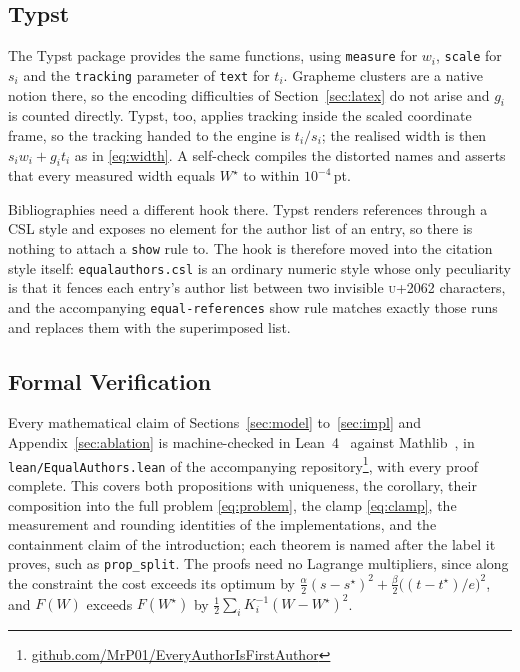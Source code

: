 \documentclass[10pt,twocolumn]{article}
\newcommand{\code}{\lstinline}
\newcommand{\repolink}{\href{https://github.com/MrP01/EveryAuthorIsFirstAuthor}{github.com/MrP01/EveryAuthorIsFirstAuthor}}
\theoremstyle{plain}
\theoremstyle{definition}
\begin{document}
  \subsection{Typst}
  The Typst package provides the same functions, using \code|measure| for $w_i$, \code|scale| for $s_i$ and the \code|tracking| parameter of \code|text| for $t_i$.
  Grapheme clusters are a native notion there, so the encoding difficulties of Section~\ref{sec:latex} do not arise and $g_i$ is counted directly.
  Typst, too, applies tracking inside the scaled coordinate frame, so the tracking handed to the engine is $t_i / s_i$; the realised width is then $s_i w_i + g_i t_i$ as in \eqref{eq:width}.
  A self-check compiles the distorted names and asserts that every measured width equals $W^\star$ to within $10^{-4}$\,pt.

  Bibliographies need a different hook there.
  Typst renders references through a CSL style and exposes no element for the author list of an entry, so there is nothing to attach a \code|show| rule to.
  The hook is therefore moved into the citation style itself: \code|equalauthors.csl| is an ordinary numeric style whose only peculiarity is that it fences each entry's author list between two invisible \textsc{u+2062} characters, and the accompanying \code|equal-references| show rule matches exactly those runs and replaces them with the superimposed list.

  \subsection{Formal Verification}
  \label{sec:lean}
  Every mathematical claim of Sections~\ref{sec:model} to~\ref{sec:impl} and Appendix~\ref{sec:ablation} is machine-checked in Lean~4~\cite{demoura2021lean4} against Mathlib~\cite{mathlib2020}, in \code|lean/EqualAuthors.lean| of the accompanying repository\footnote{\repolink}, with every proof complete.
  This covers both propositions with uniqueness, the corollary, their composition into the full problem \eqref{eq:problem}, the clamp \eqref{eq:clamp}, the measurement and rounding identities of the implementations, and the containment claim of the introduction; each theorem is named after the label it proves, such as \code|prop_split|.
  The proofs need no Lagrange multipliers, since along the constraint the cost exceeds its optimum by $\frac{\alpha}{2}(s - s^\star)^2 + \frac{\beta}{2}\bigl((t - t^\star)/e\bigr)^2$, and $F(W)$ exceeds $F(W^\star)$ by $\frac12 \sum_i K_i^{-1} (W - W^\star)^2$.
\end{document}
